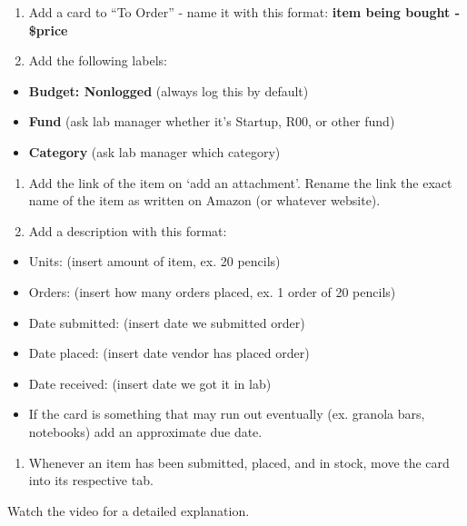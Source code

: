 \documentclass[]{book}
\providecommand{\tightlist}{%
  \setlength{\itemsep}{0pt}\setlength{\parskip}{0pt}}
\begin{document}
\begin{enumerate}
\def\labelenumi{\arabic{enumi}.}
\setcounter{enumi}{1}
\item
  Add a card to ``To Order'' - name it with this format: \textbf{item
  being bought - \$price}
\item
  Add the following labels:
\end{enumerate}

\begin{itemize}
\tightlist
\item
  \textbf{Budget: Nonlogged} (always log this by default)
\item
  \textbf{Fund} (ask lab manager whether it's Startup, R00, or other
  fund)
\item
  \textbf{Category} (ask lab manager which category)
\end{itemize}

\begin{enumerate}
\def\labelenumi{\arabic{enumi}.}
\setcounter{enumi}{3}
\item
  Add the link of the item on `add an attachment'. Rename the link the
  exact name of the item as written on Amazon (or whatever website).
\item
  Add a description with this format:
\end{enumerate}

\begin{itemize}
\tightlist
\item
  Units: (insert amount of item, ex. 20 pencils)
\item
  Orders: (insert how many orders placed, ex. 1 order of 20 pencils)
\item
  Date submitted: (insert date we submitted order)
\item
  Date placed: (insert date vendor has placed order)
\item
  Date received: (insert date we got it in lab)
\item
  If the card is something that may run out eventually (ex. granola
  bars, notebooks) add an approximate due date.
\end{itemize}

\begin{enumerate}
\def\labelenumi{\arabic{enumi}.}
\setcounter{enumi}{5}
\tightlist
\item
  Whenever an item has been submitted, placed, and in stock, move the
  card into its respective tab.
\end{enumerate}

Watch the video for a detailed explanation.
\end{document}
